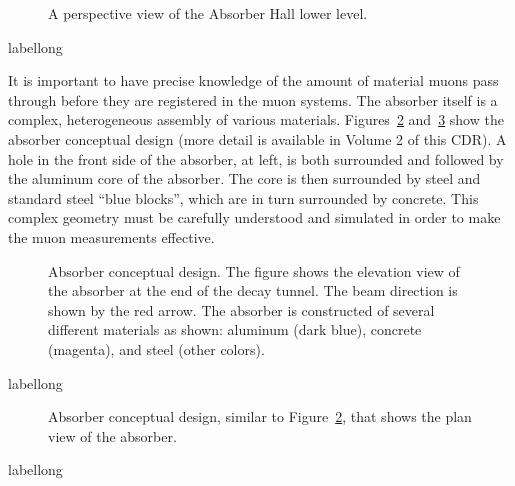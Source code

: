 \begin{figure}[htbp]
\begin{center}
\caption[The lower level of the Absorber Hall]{A perspective view of the 
Absorber Hall lower level.}
\label{fig:AbsorberFloorLevel}
\end{center}
\end{figure}
\begin{cdrfigure}[short]{label}{long}
\end{cdrfigure}

It is important to have precise knowledge of the amount of material muons pass
through before they are registered in the muon systems. The absorber
itself is a complex, heterogeneous assembly of various
materials. 
Figures~\ref{fig:AbsorberDetailElev} and~\ref{fig:AbsorberDetailPlan} show the absorber conceptual design (more detail is available in Volume 2 of this CDR). A hole
in the front side of the absorber, at left, is both surrounded and followed by the
aluminum core of the absorber. The core is then surrounded by steel 
and standard steel ``blue blocks'', 
which are in turn surrounded by concrete.  This
complex geometry must be carefully understood and simulated in order
to make the muon measurements effective. 


\begin{figure}[htbp]
\begin{center}
\centering
\caption[Absorber conceptual design, elevation view]{ Absorber conceptual design. The figure shows
the elevation view of the absorber at the end of the decay tunnel. The beam direction is shown by
the red arrow. The absorber is constructed of several different materials as shown: aluminum (dark blue), concrete (magenta), and steel (other colors). } 
\label{fig:AbsorberDetailElev}
\end{center}
\end{figure}
\begin{cdrfigure}[short]{label}{long}
\end{cdrfigure}

\begin{figure}[htbp]
\begin{center}
\centering
\caption[Absorber conceptual design, plan view]{Absorber conceptual design, 
similar to Figure~\ref{fig:AbsorberDetailElev}, that 
shows the plan view of the absorber.} 
\label{fig:AbsorberDetailPlan}
\end{center}
\end{figure}
\begin{cdrfigure}[short]{label}{long}
\end{cdrfigure}

